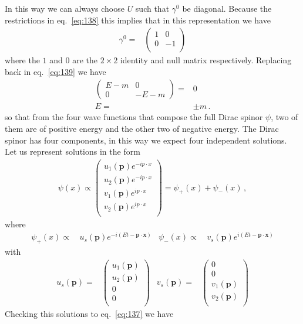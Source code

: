 \begin{frame}
In this way we can always choose $U$ such that $\gamma^0$ be diagonal. Because the restrictions in eq.~\eqref{eq:138} this implies that in this representation we have
\begin{align}
  \gamma^0=&\begin{pmatrix}
    1 & 0 \\
    0 & -1\\
  \end{pmatrix}
\end{align}
where the $1$ and $0$ are the $2\times2$ identity and null matrix respectively. Replacing back in eq.~\eqref{eq:139} we have
\begin{align}
  \begin{pmatrix}
    E-m&0\\
    0  &-E-m
  \end{pmatrix}=&0\nonumber\\
  E=&\pm m\,.
\end{align}
so that from the four wave functions that compose the full Dirac spinor $\psi$, two of them are of positive energy and the other two of negative energy. 
The Dirac spinor has four components, in this way we expect four independent solutions. Let us represent solutions in the form
\begin{align}
\label{eq:136}
  \psi(x)\propto
  \begin{pmatrix}
    u_1(\mathbf{p})e^{-i p\cdot x}\\
    u_2(\mathbf{p})e^{-i p\cdot x}\\
    v_1(\mathbf{p})e^{i p\cdot x}\\
    v_2(\mathbf{p})e^{i p\cdot x}\\
  \end{pmatrix}
 =\psi_+(x)+\psi_-(x)\,,
\end{align}
where
\begin{align}
  \psi_+(x)\propto\,&u_s(\mathbf{p})e^{-i (E t-\mathbf{p}\cdot \mathbf{x})}&
  \psi_-(x)\propto\,&v_s(\mathbf{p})e^{i (E t-\mathbf{p}\cdot \mathbf{x})}
\end{align}
with
\begin{align}
  u_s(\mathbf{p})=&\begin{pmatrix}
    u_1(\mathbf{p})\\
    u_2(\mathbf{p})\\
    0\\
    0\\
  \end{pmatrix}&
  v_s(\mathbf{p})=& \begin{pmatrix}
    0\\
    0\\
    v_1(\mathbf{p})\\
    v_2(\mathbf{p})\\
  \end{pmatrix}
\end{align}
Checking this solutions to eq.~\eqref{eq:137} we have


\end{frame}
